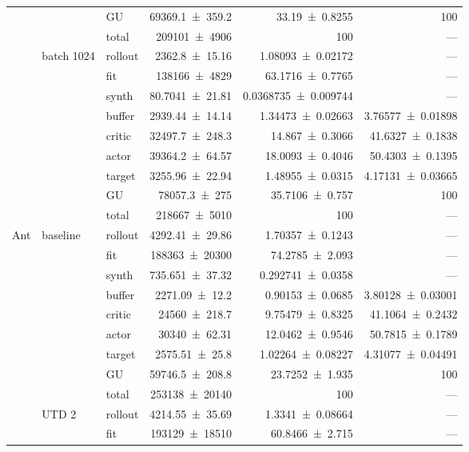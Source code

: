 {\begin{longtable}{@{}lllrrr@{}}
     &  & GU & \num{69369.1+-359.2} & \num{33.19+-0.8255} & 100 \\
     &  & total & \num{209101+-4906} & \num{100} & --- \\
    \addlinespace[2pt]
     & batch 1024 & rollout & \num{2362.8+-15.16} & \num{1.08093+-0.02172} & --- \\
     &  & fit & \num{138166+-4829} & \num{63.1716+-0.7765} & --- \\
     &  & synth & \num{80.7041+-21.81} & \num{0.0368735+-0.009744} & --- \\
     &  & buffer & \num{2939.44+-14.14} & \num{1.34473+-0.02663} & \num{3.76577+-0.01898} \\
     &  & critic & \num{32497.7+-248.3} & \num{14.867+-0.3066} & \num{41.6327+-0.1838} \\
     &  & actor & \num{39364.2+-64.57} & \num{18.0093+-0.4046} & \num{50.4303+-0.1395} \\
     &  & target & \num{3255.96+-22.94} & \num{1.48955+-0.0315} & \num{4.17131+-0.03665} \\
     &  & GU & \num{78057.3+-275} & \num{35.7106+-0.757} & 100 \\
     &  & total & \num{218667+-5010} & \num{100} & --- \\
    \addlinespace[2pt]
    \midrule
    Ant & baseline & rollout & \num{4292.41+-29.86} & \num{1.70357+-0.1243} & --- \\
     &  & fit & \num{188363+-20300} & \num{74.2785+-2.093} & --- \\
     &  & synth & \num{735.651+-37.32} & \num{0.292741+-0.0358} & --- \\
     &  & buffer & \num{2271.09+-12.2} & \num{0.90153+-0.0685} & \num{3.80128+-0.03001} \\
     &  & critic & \num{24560+-218.7} & \num{9.75479+-0.8325} & \num{41.1064+-0.2432} \\
     &  & actor & \num{30340+-62.31} & \num{12.0462+-0.9546} & \num{50.7815+-0.1789} \\
     &  & target & \num{2575.51+-25.8} & \num{1.02264+-0.08227} & \num{4.31077+-0.04491} \\
     &  & GU & \num{59746.5+-208.8} & \num{23.7252+-1.935} & 100 \\
     &  & total & \num{253138+-20140} & \num{100} & --- \\
    \addlinespace[2pt]
     & UTD 2 & rollout & \num{4214.55+-35.69} & \num{1.3341+-0.08664} & --- \\
     &  & fit & \num{193129+-18510} & \num{60.8466+-2.715} & --- \\

\end{longtable}}
